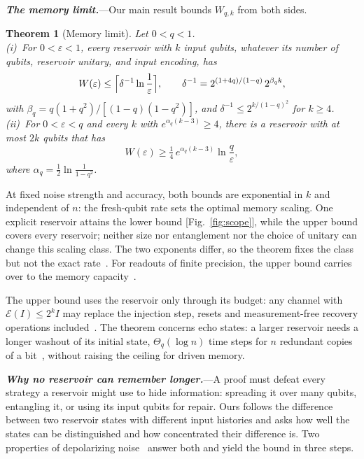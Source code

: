 \documentclass[aps,prl,twocolumn,superscriptaddress,floatfix]{revtex4-2}
\theoremstyle{plain}
\newtheorem{theorem}{Theorem}
\newcommand{\cE}{\mathcal E}
\newcommand{\runin}[1]{\textit{\textbf{#1}}---}
\begin{document}
\runin{The memory limit.}Our main result bounds $W_{q,k}$ from both sides.

\begin{theorem}[Memory limit]\label{thm:main}
Let $0<q<1$.\\[2pt]
(i)~For $0<\varepsilon<1$, every reservoir with $k$ input qubits, whatever its number of qubits, reservoir unitary, and input encoding, has
\begin{equation}
W(\varepsilon)\le\Bigl\lceil\delta^{-1}\ln\frac1\varepsilon\Bigr\rceil,\qquad\delta^{-1}=2^{(1+4q)/(1-q)}\,2^{\beta_qk},
\label{eq:upper}
\end{equation}
with $\beta_q=q(1+q^2)/[(1-q)(1-q^2)]$, and \mbox{$\delta^{-1}\le2^{k/(1-q)^2}$} for $k\ge4$.\\[2pt]
(ii)~For $0<\varepsilon<q$ and every $k$ with $e^{\alpha_q(k-3)}\ge4$, there is a reservoir with at most $2k$ qubits that has
\begin{equation}
W(\varepsilon)\ge\tfrac14\,e^{\alpha_q(k-3)}\ln\frac q\varepsilon ,
\label{eq:lower}
\end{equation}
where $\alpha_q=\frac12\ln\frac1{1-q^2}$.
\end{theorem}

At fixed noise strength and accuracy, both bounds are exponential in $k$ and independent of $n$: the fresh-qubit rate sets the optimal memory scaling. One explicit reservoir attains the lower bound [Fig.~\ref{fig:scope}], while the upper bound covers every reservoir; neither size nor entanglement nor the choice of unitary can change this scaling class. The two exponents differ, so the theorem fixes the class but not the exact rate~\cite[Sec.~III\,G]{SM}. For readouts of finite precision, the upper bound carries over to the memory capacity~\cite{SM,Jaeger2002}.

The upper bound uses the reservoir only through its budget: any channel with $\cE(I)\le2^kI$ may replace the injection step, resets and measurement-free recovery operations included~\cite{SM}. The theorem concerns echo states: a larger reservoir needs a longer washout of its initial state, $\Theta_q(\log n)$ time steps for $n$ redundant copies of a bit~\cite{SM}, without raising the ceiling for driven memory.

\runin{Why no reservoir can remember longer.}A proof must defeat every strategy a reservoir might use to hide information: spreading it over many qubits, entangling it, or using its input qubits for repair. Ours follows the difference between two reservoir states with different input histories and asks how well the states can be distinguished and how concentrated their difference is. Two properties of depolarizing noise~\cite{King2014,Cubitt2015} answer both and yield the bound in three steps.
\end{document}
